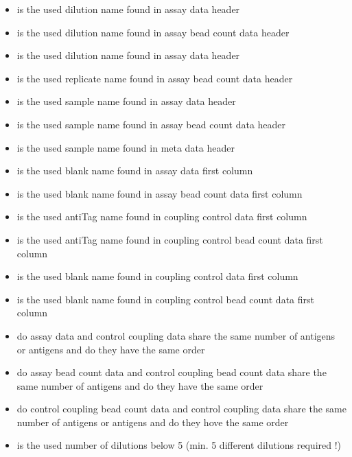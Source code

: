 \documentclass[
]{book}
\providecommand{\tightlist}{%
  \setlength{\itemsep}{0pt}\setlength{\parskip}{0pt}}
\begin{document}
\begin{itemize}
\tightlist
\item
  is the used dilution name found in assay data header
\item
  is the used dilution name found in assay bead count data header
\item
  is the used dilution name found in assay data header
\item
  is the used replicate name found in assay bead count data header
\item
  is the used sample name found in assay data header
\item
  is the used sample name found in assay bead count data header
\item
  is the used sample name found in meta data header
\item
  is the used blank name found in assay data first column
\item
  is the used blank name found in assay bead count data first column
\item
  is the used antiTag name found in coupling control data first column
\item
  is the used antiTag name found in coupling control bead count data first column
\item
  is the used blank name found in coupling control data first column
\item
  is the used blank name found in coupling control bead count data first column
\item
  do assay data and control coupling data share the same number of antigens or antigens and do they have the same order
\item
  do assay bead count data and control coupling bead count data share the same number of antigens and do they have the same order
\item
  do control coupling bead count data and control coupling data share the same number of antigens or antigens and do they hove the same order
\item
  is the used number of dilutions below 5 (min. 5 different dilutions required !)
\end{itemize}
\end{document}
